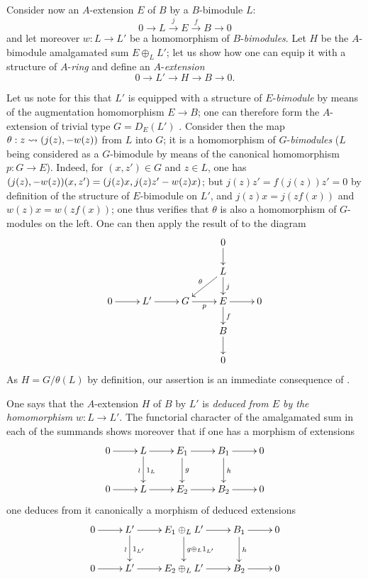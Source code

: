 \begin{env}[18.2.8]
\label{0.18.2.8}
Consider now an $A$-extension $E$ of $B$ by a $B$-bimodule $L$:
\[
  0\to L\xrightarrow{j} E\xrightarrow{f} B\to 0
\]
and let moreover $w:L\to L'$ be a homomorphism of $B$-\emph{bimodules}.
Let $H$ be the $A$-bimodule amalgamated sum $E\oplus_L L'$; let us show how one can equip it with a structure of $A$-\emph{ring} and define an $A$-\emph{extension}
\[
  0\to L'\to H\to B\to 0.
\]

Let us note for this that $L'$ is equipped with a structure of $E$-\emph{bimodule} by means of the augmentation homomorphism $E\to B$; one can therefore form the $A$-extension of trivial type $G=D_E(L')$ .
Consider then the map $\theta:z\leadsto(j(z),- w(z))$ from $L$ into $G$; it is a homomorphism of $G$-\emph{bimodules} ($L$ being considered as a $G$-bimodule by means of the canonical homomorphism $p:G\to E$).
Indeed, for $(x,z')\in G$ and $z\in L$, one has $(j(z),- w(z))(x,z')=(j(z)x,j(z)z'- w(z)x)$; but $j(z)z'=f(j(z))z'=0$ by definition of the structure of $E$-bimodule on $L'$, and $j(z)x=j(zf(x))$ and $w(z)x=w(zf(x))$; one thus verifies that $\theta$ is also a homomorphism of $G$-modules on the left.
One can then apply the result of  to the diagram
\[
  \xymatrix@C=2pc@R=1.4pc{
    & & & 0\ar[d] & \\
    & & & L\ar[ld]_\theta\ar[d]^j & \\
    0\ar[r] & L'\ar[r] & G\ar[r]_p & E\ar[r]\ar[d]^f & 0\\
    & & & B\ar[d]\\
    & & & 0
  }
\]
As $H=G/\theta(L)$ by definition, our assertion is an immediate consequence of .


One says that the $A$-extension $H$ of $B$ by $L'$ is \emph{deduced from $E$ by the homomorphism} $w:L\to L'$.
The functorial character of the amalgamated sum in each of the summands shows moreover that if one has a morphism of extensions
\[
  \xymatrix{
    0\ar[r] & L\ar[r]\ar[d]^{1_L}_{\wr} & E_1\ar[r]\ar[d]^g & B_1\ar[r]\ar[d]^h & 0\\
    0\ar[r] & L\ar[r] & E_2\ar[r] & B_2\ar[r] & 0
  }
\]
one deduces from it canonically a morphism of deduced extensions
\[
  \xymatrix{
    0\ar[r] & L'\ar[r]\ar[d]^{1_{L'}}_{\wr} & E_1\oplus_L L'\ar[r]\ar[d]^{g\oplus_L1_{L'}} & B_1\ar[r]\ar[d]^h & 0\\
    0\ar[r] & L'\ar[r] & E_2\oplus_L L'\ar[r] & B_2\ar[r] & 0
  }
\]


\end{env}
